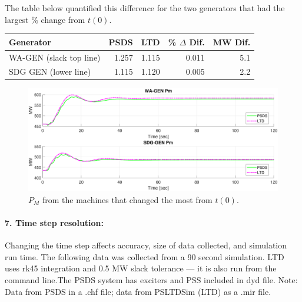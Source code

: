 \documentclass[12pt]{article}
\begin{document}
The table below quantified this difference for the two generators that had the largest \% change from $t(0)$.

\begin{table}[!ht]
	\centering
	\begin{tabular}{@{} lrrrr @{}} 	
		\toprule %
		\footnotesize %
		 Generator & PSDS  & LTD  & \% $\Delta$ Dif. & MW Dif.  \\
		\midrule		
		WA-GEN (slack top line) & 1.257  & 1.115  & 0.011   & 5.1\\
		SDG GEN (lower line) & 1.115  & 1.120  & 0.005 & 2.2 \\
		\bottomrule
	\end{tabular}

\end{table}

	\begin{figure}[h!]
			\centering
			\includegraphics[width=\linewidth]{pmCompare}\vspace{-1em}
			\caption{$P_M$ from the machines that changed the most from $t(0)$.}
			\label{pmCompare}		 
	\end{figure}\vspace{-.5em}

\pagebreak
\paragraph{7. Time step resolution:} Changing the time step affects accuracy, size of data collected, and simulation run time. The following data was collected from a 90 second simulation. LTD uses rk45 integration and 0.5 MW slack tolerance --- it is also run from the command line.The PSDS system has exciters and PSS included in dyd file.
Note: Data from PSDS in a .chf file; data from PSLTDSim (LTD) as a .mir file.
\end{document}
